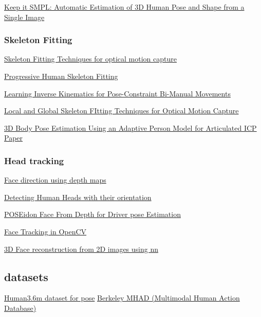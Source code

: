 \href{http://files.is.tue.mpg.de/black/papers/BogoECCV2016.pdf}{Keep it SMPL: Automatic Estimation of 3D Human Pose and Shape from a Single Image}

\subsubsection{Skeleton Fitting}

\href{https://pdfs.semanticscholar.org/8492/075b6d9ed4a3065849d0b0eb7a705a5112b9.pdf}{Skeleton Fitting Techniques for optical motion capture}

\href{http://vision.gel.ulaval.ca/~vignolaj/vignolaVI03.pdf}{Progressive Human Skeleton Fitting}

\href{https://link.springer.com/content/pdf/10.1007/978-3-642-15193-4_45.pdf}{Learning Inverse Kinematics for Pose-Constraint Bi-Manual Movements}

\href{https://pdfs.semanticscholar.org/8492/075b6d9ed4a3065849d0b0eb7a705a5112b9.pdf}{Local and Global Skeleton FItting Techniques for Optical Motion Capture}

\href{https://link.springer.com/chapter/10.1007\%2F978-3-642-25489-5_16}{3D Body Pose Estimation Using an Adaptive Person Model for Articulated ICP}
\href{https://link.springer.com/content/pdf/10.1007\%2F978-3-642-25489-5_16.pdf}{Paper}

\subsubsection{Head tracking}
\href{https://arxiv.org/pdf/1309.3418.pdf}{Face direction using depth maps}

\href{http://www.dgcv.nii.ac.jp/Publications/Papers/2005/elcviaVol5No3-05.pdf}{Detecting Human Heads with their orientation}

\href{https://arxiv.org/abs/1611.10195}{POSEidon Face From Depth for Driver pose Estimation}

\href{https://www.youtube.com/watch?v=JO8XHzc6JPQ}{Face Tracking in OpenCV}

\href{http://aaronsplace.co.uk/papers/jackson2017recon/}{3D Face reconstruction from 2D images using nn}

\subsection{datasets}
\href{http://vision.imar.ro/human3.6m/description.php}{Human3.6m dataset for pose}
\href{http://tele-immersion.citris-uc.org/berkeley_mhad}{Berkeley MHAD (Multimodal Human Action Database)}



